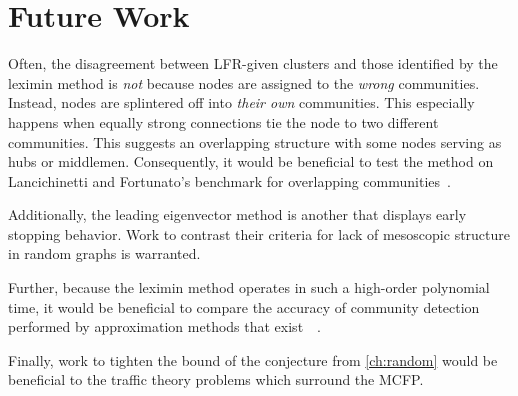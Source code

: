 \section{Future Work}

Often, the disagreement between LFR-given clusters and those identified by the leximin method is \emph{not} because nodes are assigned to the \emph{wrong} communities. Instead, nodes are splintered off into \emph{their own} communities. This especially happens when equally strong connections tie the node to two different communities. This suggests an overlapping structure with some nodes serving as hubs or middlemen. Consequently, it would be beneficial to test the method on Lancichinetti and Fortunato's benchmark for overlapping communities~\cite{lancichinetti2009benchmarks}.

Additionally, the leading eigenvector method is another that displays early stopping behavior. Work to contrast their criteria for lack of mesoscopic structure in random graphs is warranted.

Further, because the leximin method operates in such a high-order polynomial time, it would be beneficial to compare the accuracy of community detection performed by approximation methods that exist~\cite{shahrokhi1989approximation}~\cite{madry2010faster}.

Finally, work to tighten the bound of the conjecture from \autoref{ch:random} would be beneficial to the traffic theory problems which surround the MCFP.
